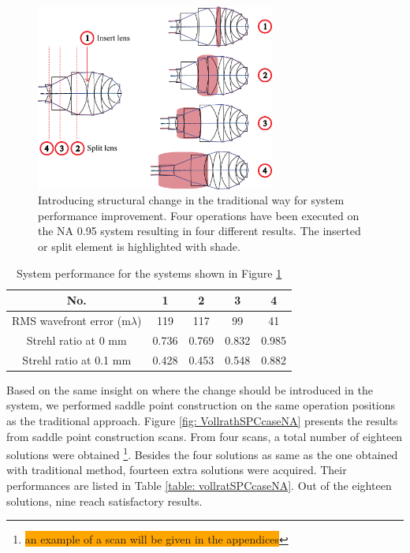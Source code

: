 \begin{figure}[h!]
    \centering
    \includegraphics[width=0.7\textwidth]{chapter-4/figures/Vollrath_NATradition.png}
    \caption{Introducing structural change in the traditional way for system performance improvement. Four operations have been executed on the NA 0.95 system resulting in four different results. The inserted or split element is highlighted with shade.}
    \label{fig: vollrathNAtrad}
\end{figure}

\setlength{\arrayrulewidth}{.5mm}
\setlength{\tabcolsep}{18pt}
\renewcommand{\arraystretch}{1.2}
\begin{table}[h!]
    \centering
    \captionsetup{justification=centering}
    \caption{System performance for the systems shown in Figure \ref{fig: vollrathNAtrad}}
    \label{table: vollrathNAtrad}
    \vspace{-1em}
    \begin{adjustbox}{max width=\textwidth, center}
    \begin{tabular}{c c c c c}
    \hline 
     No. & \textbf{1} & \textbf{2} & \textbf{3} & \textbf{4}\\ 
     \midrule
    RMS wavefront error (m$\lambda$) & 119 & 117 & 99 & 41 \\ 
    Strehl ratio at 0 mm & 0.736 & 0.769 & 0.832 & 0.985\\
    Strehl ratio at 0.1 mm & 0.428 & 0.453 & 0.548 & 0.882\\
    \hline
    \end{tabular}
    \end{adjustbox}
\end{table}


Based on the same insight on where the change should be introduced in the system, we performed saddle point construction on the same operation positions as the traditional approach. Figure \ref{fig: VollrathSPCcaseNA} presents the results from saddle point construction scans. From four scans, a total number of eighteen solutions were obtained \footnote{\colorbox{orange}{an example of a scan will be given in the appendices}}. Besides the four solutions as same as the one obtained with traditional method, fourteen extra solutions were acquired. Their performances are listed in Table \ref{table: vollratSPCcaseNA}. Out of the eighteen solutions, nine reach satisfactory results. 

